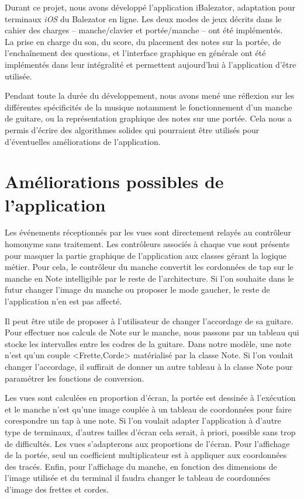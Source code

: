 \documentclass{scrreprt}
\begin{document}
Durant ce projet, nous avons développé l'application iBalezator, adaptation pour terminaux \textit{iOS} du Balezator en ligne. 
Les deux modes de jeux décrits dans le cahier des charges -- manche/clavier et portée/manche -- ont été implémentés. \\
La prise en charge du son, du score, du placement des notes sur la portée, de l'enchaînement des questions, et l'interface graphique en générale
ont été implémentés dans leur intégralité et permettent aujourd'hui à l'application d'être utilisée.


Pendant toute la durée du développement, nous avons mené une réflexion sur les différentes spécificités de la musique  notamment le fonctionnement d'un manche de guitare, 
ou la représentation graphique des notes sur une portée. Cela nous a permis d'écrire des algorithmes solides qui pourraient être utilisés pour d'éventuelles améliorations
de l'application.



\section{Améliorations possibles de l'application}
Les événements réceptionnés par les vues sont directement relayés au contrôleur homonyme sans traitement.
Les contrôleurs associés à chaque vue sont présents pour masquer la partie graphique de l'application aux classes gérant la logique métier.
Pour cela, le contrôleur du manche convertit les cordonnées de tap sur le manche en Note intelligible par le reste de l'architecture.
Si l'on souhaite dans le futur changer l'image du manche ou proposer le mode gaucher, le reste de l'application n'en est pas affecté.
\newline

Il peut être utile de proposer à l'utilisateur de changer l'accordage de sa guitare.
Pour effectuer nos calculs de Note sur le manche, nous passons par un tableau qui stocke les intervalles entre les codres de la guitare.
Dans notre modèle, une note n'est qu'un couple <Frette,Corde> matérialisé par la classe Note.
Si l'on voulait changer l'accordage, il suffirait de donner un autre tableau à la classe Note pour paramétrer les fonctions de conversion.
\newline

Les vues sont calculées en proportion d'écran, la portée est dessinée à l'exécution et le manche n'est qu'une image couplée à un tableau de coordonnées pour faire corespondre un tap à une note.
Si l'on voulait adapter l'application à d'autre type de terminaux, d'autres tailles d'écran cela serait, à priori, possible sans trop de difficultés.
Les vues s'adapterons aux proportions de l'écran. 
Pour l'affichage de la portée, seul un coefficient multiplicateur est à appliquer aux coordonnées des tracés.
Enfin, pour l'affichage du manche, en fonction des dimensions de l'image utilisée et du terminal il faudra changer le tableau de coordonnées d'image des frettes et cordes.\\
\newline
\end{document}
